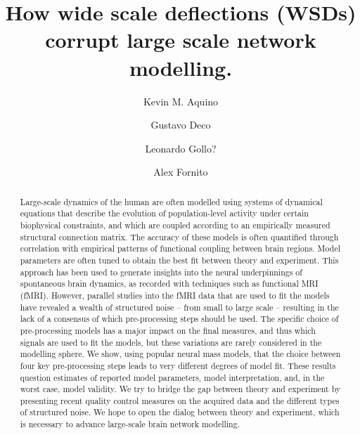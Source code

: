 \documentclass[oneside]{zHenriquesLab-StyleBioRxiv}
\begin{document}
\title{How wide scale deflections (WSDs) corrupt large scale network modelling.}

\author[1,*]{Kevin M. Aquino}
\author[1,2]{Gustavo Deco}
\author[3]{Leonardo Gollo?}
\author[1]{Alex Fornito}


\maketitle

\begin{abstract}
Large-scale dynamics of the human are often modelled using systems of dynamical equations that describe the evolution of population-level activity under certain biophysical constraints, and which are coupled according to an empirically measured structural connection matrix. 
The accuracy of these models is often quantified through correlation with empirical patterns of functional coupling between brain regions. 
Model parameters are often tuned to obtain the best fit between theory and experiment. This approach has been used to generate insights into the neural underpinnings of spontaneous brain dynamics, as recorded with techniques such as functional MRI (fMRI).
However, parallel studies into the fMRI data that are used to fit the models have revealed a wealth of structured noise – from small to large scale – resulting in the lack of a consensus of which pre-processing steps should be used. 
The specific choice of pre-processing models has a major impact on the final measures, and thus which signals are used to fit the models, but these variations are rarely considered in the modelling sphere. 
We show, using  popular neural mass models, that the choice between four key pre-processing steps leads to very different degrees of model fit. 
These results question estimates of reported model parameters, model interpretation, and, in the worst case, model validity. 
We try to bridge the gap between theory and experiment by presenting recent quality control measures on the acquired data and the different types of structured noise. 
We hope to open the dialog between theory and experiment, which is necessary to advance large-scale brain network modelling.
\end{abstract}
\end{document}
